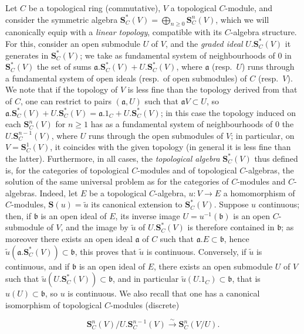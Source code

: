 \begin{env}[19.5.1]
\label{0.19.5.1}
Let $C$ be a topological ring (commutative), $V$ a topological $C$-module, and consider the symmetric algebra $\mathbf{S}_C^*(V)=\bigoplus_{n\geq 0}\mathbf{S}_C^n(V)$, which we will canonically equip with a \emph{linear topology}, compatible with its $C$-algebra structure.
For this, consider an open submodule $U$ of $V$, and the \emph{graded ideal} $U.\mathbf{S}_C^*(V)$ it generates in $\mathbf{S}_C^*(V)$;
we take as fundamental system of neighbourhoods of $0$ in $\mathbf{S}_C^*(V)$ the set of sums $\mathfrak{a}.\mathbf{S}_C^*(V)+U.\mathbf{S}_C^*(V)$, where $\mathfrak{a}$ (resp.\ $U$) runs through a fundamental system of open ideals (resp.\ of open submodules) of $C$ (resp.\ $V$).
We note that if the topology of $V$ is less fine than the topology derived from that of $C$, one can restrict to pairs $(\mathfrak{a},U)$ such that $\mathfrak{a}V\subset U$, so $\mathfrak{a}.\mathbf{S}_C^*(V)+U.\mathbf{S}_C^*(V)=\mathfrak{a}.1_C+U.\mathbf{S}_C^*(V)$;
in this case the topology induced on each $\mathbf{S}_C^n(V)$ for $n\geq 1$ has as a fundamental system of neighbourhoods of $0$ the $U.\mathbf{S}_C^{n-1}(V)$, where $U$ runs through the open submodules of $V$;
in particular, on $V=\mathbf{S}_C^1(V)$, it coincides with the given topology (in general it is less fine than the latter).
Furthermore, in all cases, the \emph{topological algebra} $\mathbf{S}_C^*(V)$ thus defined is, for the categories of topological $C$-modules and of topological $C$-algebras, the solution of the same universal problem as for the categories of $C$-modules and $C$-algebras.
Indeed, let $E$ be a topological $C$-algebra, $u:V\to E$ a homomorphism of $C$-modules, $\mathbf{S}(u)=\widetilde{u}$ its canonical extension to $\mathbf{S}_C^*(V)$.
Suppose $u$ continuous; then, if $\mathfrak{b}$ is an open ideal of $E$, its inverse image $U=u^{-1}(\mathfrak{b})$ is an open $C$-submodule of $V$, and the image by $\widetilde{u}$ of $U.\mathbf{S}_C^*(V)$ is therefore contained in $\mathfrak{b}$;
as moreover there exists an open ideal $\mathfrak{a}$ of $C$ such that $\mathfrak{a}.E\subset\mathfrak{b}$, hence $\widetilde{u}(\mathfrak{a}.\mathbf{S}_C^*(V))\subset\mathfrak{b}$, this proves that $\widetilde{u}$ is continuous.
Conversely, if $\widetilde{u}$ is continuous, and if $\mathfrak{b}$ is an open ideal of $E$, there exists an open submodule $U$ of $V$ such that $\widetilde{u}(U.\mathbf{S}_C^*(V))\subset\mathfrak{b}$, and in particular $\widetilde{u}(U.1_C)\subset\mathfrak{b}$, that is $u(U)\subset\mathfrak{b}$, so $u$ is continuous.
We also recall that one has a canonical isomorphism of topological $C$-modules (discrete)

\[
\mathbf{S}_C^n(V)/U.\mathbf{S}_C^{n-1}(V) \xrightarrow{\sim} \mathbf{S}_C^n(V/U). \tag{19.5.1.1}
\]

\end{env}

